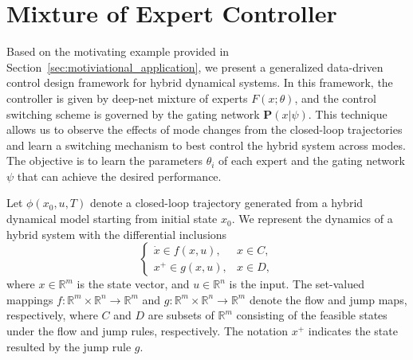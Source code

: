 \section{Mixture of Expert Controller}
\label{sec:moe_methods}

Based on the motivating example provided in
Section~\ref{sec:motiviational_application}, we present a generalized
data-driven control design framework for hybrid dynamical systems.
%
In this framework, the controller is given by deep-net mixture of experts
$F(x;\theta)$, and the control switching scheme is governed by the gating
network $\mathbf{P}(x|\psi)$.
%
This technique allows us to observe the effects of mode changes from the
closed-loop trajectories and learn a switching mechanism to best control the
hybrid system across modes.
%
The objective is to learn the parameters $\theta_i$ of each expert and the
gating network $\psi$ that can achieve the desired performance.


%
Let $\phi(x_0, u, T)$ denote a closed-loop trajectory generated from a hybrid
dynamical model starting from initial state $x_0$.
%
We represent the dynamics of a hybrid system with the differential
inclusions\cite{goebel2009hybrid}
\begin{equation}
    \begin{cases}
        \dot{x} \in f(x, u), & x \in C,\\
        x^+ \in g(x, u), & x \in D,
    \end{cases}
    \label{eq:cont_and_guards}
\end{equation}
\noindent where $x \in \mathbb{R}^m$ is the state vector, and $u \in
\mathbb{R}^n$ is the input.
%
The set-valued mappings $f: \mathbb{R}^m \times \mathbb{R}^n \rightarrow
\mathbb{R}^m$ and $g: \mathbb{R}^m \times \mathbb{R}^n \rightarrow \mathbb{R}^m$
denote the flow and jump maps, respectively, where $C$ and $D$ are subsets of
$\mathbb{R}^m$ consisting of the feasible states under the flow and jump
rules, respectively. 
%
The notation $x^+$ indicates the state resulted by the jump rule $g$.
%


